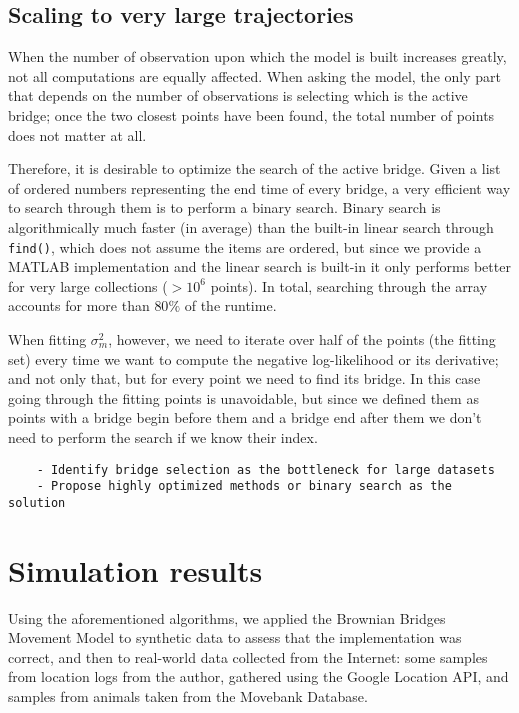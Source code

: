 \documentclass{article}
\begin{document}
\subsection{Scaling to very large trajectories}

When the number of observation upon which the model is built increases greatly, not all computations are equally affected. When asking the model, the only part that depends on the number of observations is selecting which is the active bridge; once the two closest points have been found, the total number of points does not matter at all.

Therefore, it is desirable to optimize the search of the active bridge. Given a list of ordered numbers representing the end time of every bridge, a very efficient way to search through them is to perform a binary search. Binary search is algorithmically much faster (in average) than the built-in linear search through \texttt{find()}, which does not assume the items are ordered, but since we provide a MATLAB implementation and the linear search is built-in it only performs better for very large collections ($>10^6$ points). In total, searching through the array accounts for more than $80\%$ of the runtime.

When fitting $\sigma_m^2$, however, we need to iterate over half of the points (the fitting set) every time we want to compute the negative log-likelihood or its derivative; and not only that, but for every point we need to find its bridge. In this case going through the fitting points is unavoidable, but since we defined them as points with a bridge begin before them and a bridge end after them we don't need to perform the search if we know their index.

\begin{verbatim}
    - Identify bridge selection as the bottleneck for large datasets
    - Propose highly optimized methods or binary search as the solution
\end{verbatim}

\section{Simulation results}

Using the aforementioned algorithms, we applied the Brownian Bridges Movement Model to synthetic data to assess that the implementation was correct, and then to real-world data collected from the Internet: some samples from location logs from the author, gathered using the Google Location API, and samples from animals taken from the Movebank Database.
\end{document}
